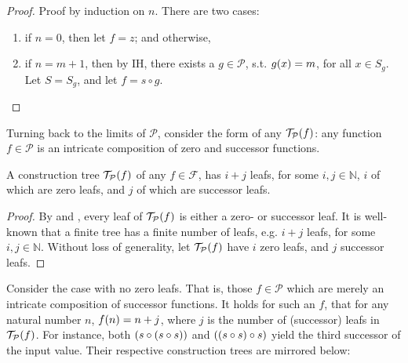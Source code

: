 \begin{proof} Proof by induction on $n$. There are two cases:

\begin{enumerate}[label=(\arabic*)]

\item if $n = 0$, then let $f = z$; and otherwise,

\item if $n = m + 1$, then by IH, there exists a $g \in \mathcal{P}$, s.t.
$g{\mathopen{}\left({x}\right)\mathclose{}} = m$, for all $x \in S_g$. Let $S=S_g$, and let $f = s \circ g$.
\end{enumerate} \end{proof}

Turning back to the limits of $\mathcal{P}$, consider the form of any
$\mathcal{T}_\mathcal{P}{\mathopen{}\left({f}\right)\mathclose{}}$: any function $f \in \mathcal{P}$ is an
intricate composition of zero and successor functions.

\begin{lemma} \label{lem:p-tree-leafs} A construction tree
$\mathcal{T}_\mathcal{P}{\mathopen{}\left({f}\right)\mathclose{}}$ of any $f \in \mathcal{F}$, has $i+j$ leafs, for
some $i,j \in \mathbb{N}$, $i$ of which are zero leafs, and $j$ of which are
successor leafs.  \end{lemma}

\begin{proof} By  and ,
every leaf of $\mathcal{T}_\mathcal{P}{\mathopen{}\left({f}\right)\mathclose{}}$ is either a zero- or successor
leaf. It is well-known that a finite tree has a finite number of leafs, e.g.
$i+j$ leafs, for some $i,j \in \mathbb{N}$. Without loss of generality, let
$\mathcal{T}_\mathcal{P}{\mathopen{}\left({f}\right)\mathclose{}}$ have $i$ zero leafs, and $j$ successor leafs.
\end{proof}

Consider the case with no zero leafs. That is, those $f \in \mathcal{P}$ which
are merely an intricate composition of successor functions. It holds for such
an $f$, that for any natural number $n$, $f{\mathopen{}\left({n}\right)\mathclose{}}=n+j$, where $j$ is the number
of (successor) leafs in $\mathcal{T}_\mathcal{P}{\mathopen{}\left({f}\right)\mathclose{}}$. For instance, both
${\mathopen{}\left({s \circ {\ensuremath{\mathopen{}\left({s \circ s}\right)\mathclose{}}}}\right)\mathclose{}}$ and ${\mathopen{}\left({{\mathopen{}\left({s \circ s}\right)\mathclose{}} \circ s}\right)\mathclose{}}$ yield the third
successor of the input value.  Their respective construction trees are mirrored
below:

\begin{figure}[h!]
\centering
%
\begin{subfigure}{0.49\textwidth}
\centering
{}
\end{subfigure}
%
\begin{subfigure}{0.49\textwidth}
\centering
{}
\end{subfigure}
\end{figure}

